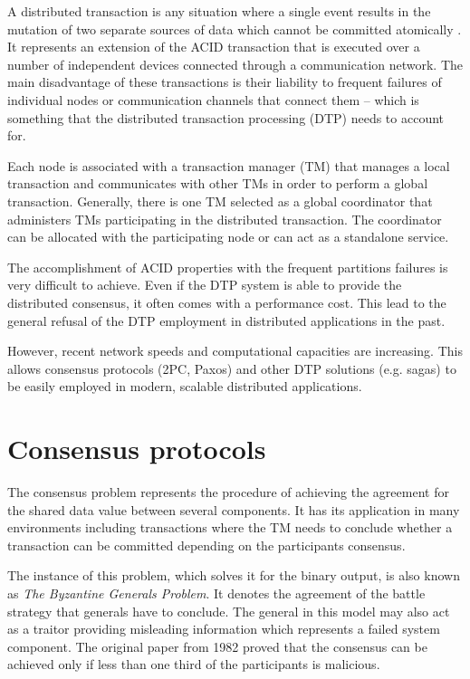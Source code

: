 \documentclass[oneside,
  digital, %
  table,   %
  nolof,     %
  nolot,     %
]{fithesis3}
\begin{document}
A distributed transaction is any situation where a single event results in the mutation of two separate sources of data which cannot be committed atomically \cite{dist_tran_icebergs}. It represents an extension of the ACID transaction that is executed over a number of independent devices connected through a communication network. The main disadvantage of these transactions is their liability to frequent failures of individual nodes or communication channels that connect them -- which is something that the distributed transaction processing (DTP) needs to account for. 

Each node is associated with a transaction manager (TM) that manages a local transaction and communicates with other TMs in order to perform a global transaction. Generally, there is one TM selected as a global coordinator that administers TMs participating in the distributed transaction. The coordinator can be allocated with the participating node or can act as a standalone service.

The accomplishment of ACID properties with the frequent partitions failures is very difficult to achieve. Even if the DTP system is able to provide the distributed consensus, it often comes with a performance cost. This lead to the general refusal of the DTP employment in distributed applications in the past. 

However, recent network speeds and computational capacities are increasing. This allows consensus protocols (2PC, Paxos) and other DTP solutions (e.g. sagas) to be easily employed in modern, scalable distributed applications.



\section{Consensus protocols}
\label{sec:consensus-protocols}

The consensus problem represents the procedure of achieving the  agreement for the shared data value between several components. It has its application in many environments including transactions where the TM needs to conclude whether a transaction can be committed depending on the participants consensus.

The instance of this problem, which solves it for the binary output, is also known as \textit{The Byzantine Generals Problem}. It denotes the agreement of the battle strategy that generals have to conclude. The general in this model may also act as a traitor providing misleading information which represents a failed system component. The original paper from 1982 \cite{byzantine-generals-problem} proved that the consensus can be achieved only if less than one third of the participants is malicious. 
\end{document}
